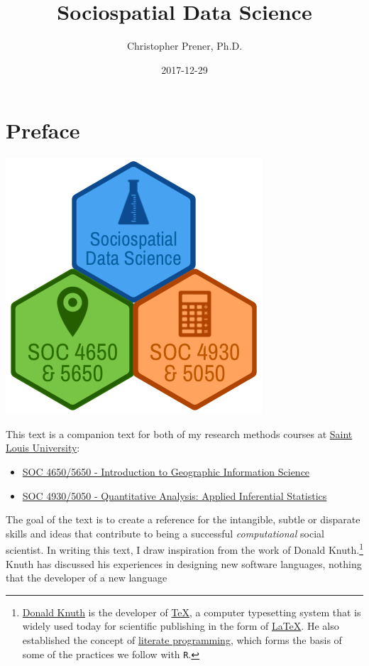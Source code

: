 \documentclass[]{book}
\title{Sociospatial Data Science}
\author{Christopher Prener, Ph.D.}
\date{2017-12-29}
\providecommand{\tightlist}{%
  \setlength{\itemsep}{0pt}\setlength{\parskip}{0pt}}
\let\rmarkdownfootnote\footnote%
\def\footnote{\protect\rmarkdownfootnote}
\theoremstyle{definition}
\theoremstyle{definition}
\theoremstyle{definition}
\theoremstyle{remark}
\begin{document}
\maketitle

{
\setcounter{tocdepth}{1}
\tableofcontents
}
\hypertarget{preface}{\chapter*{Preface}\label{preface}}

\begin{center}\includegraphics[width=0.4\linewidth]{images/SSDSBookBanner} \end{center}

This text is a companion text for both of my research methods courses at
\href{https://slu.edu}{Saint Louis University}:

\begin{itemize}
\tightlist
\item
  \href{https://slu-soc5650.github.io}{SOC 4650/5650 - Introduction to
  Geographic Information Science}
\item
  \href{https://slu-soc5050.github.io}{SOC 4930/5050 - Quantitative
  Analysis: Applied Inferential Statistics}
\end{itemize}

The goal of the text is to create a reference for the intangible, subtle
or disparate skills and ideas that contribute to being a successful
\emph{computational} social scientist. In writing this text, I draw
inspiration from the work of Donald Knuth.\footnote{\href{https://en.wikipedia.org/wiki/Donald_Knuth}{Donald
  Knuth} is the developer of
  \href{https://en.wikipedia.org/wiki/TeX}{TeX}, a computer typesetting
  system that is widely used today for scientific publishing in the form
  of \href{https://en.wikipedia.org/wiki/LaTeX}{LaTeX}. He also
  established the concept of
  \href{https://en.wikipedia.org/wiki/Literate_programming}{literate
  programming}, which forms the basis of some of the practices we follow
  with \texttt{R}.} Knuth has discussed his experiences in designing new
software languages, nothing that the developer of a new language
\end{document}

